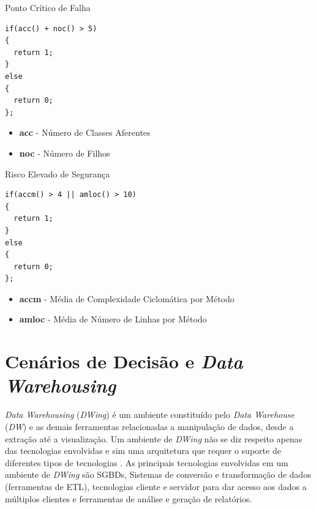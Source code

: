 \begin{description}
	\item[Ponto Crítico de Falha]
\end{description}

\begin{lstlisting}[caption={\emph{Script} do Cenário \emph{Critical Point of Failure}}, label=cpf]
if(acc() + noc() > 5)
{
  return 1;
}
else
{
  return 0;
};
\end{lstlisting}

\begin{itemize}
	\item \textbf{acc} - Número de Classes Aferentes
	\item \textbf{noc} - Número de Filhos
\end{itemize}

\begin{description}
	\item[Risco Elevado de Segurança]
\end{description}

\begin{lstlisting}[caption={\emph{Script} do Cenário \emph{High Risk Security}}, label=cpf]
if(accm() > 4 || amloc() > 10)
{
  return 1;
}
else
{
  return 0;
};
\end{lstlisting}

\begin{itemize}
	\item \textbf{accm} - Média de Complexidade Ciclomática por Método
	\item \textbf{amloc} - Média de Número de Linhas por Método
\end{itemize}

\section{Cenários de Decisão e \emph{Data Warehousing}}
\label{dw-cenarios}

\emph{Data Warehousing} (\emph{DWing}) é um ambiente constituído pelo \emph{Data Warehouse} (\emph{DW}) e as demais ferramentas relacionadas a manipulação de dados, desde a extração até a visualização. Um ambiente de \emph{DWing} não se diz respeito apenas das tecnologias envolvidas e sim uma arquitetura que requer o suporte de diferentes tipos de tecnologias \cite{inmon2002}.  As principais tecnologias envolvidas em um ambiente de \emph{DWing} são SGBDs, Sistemas de conversão e transformação de dados (ferramentas de ETL), tecnologias cliente e servidor para dar acesso aos dados a múltiplos clientes e ferramentas de análise e geração de relatórios.

